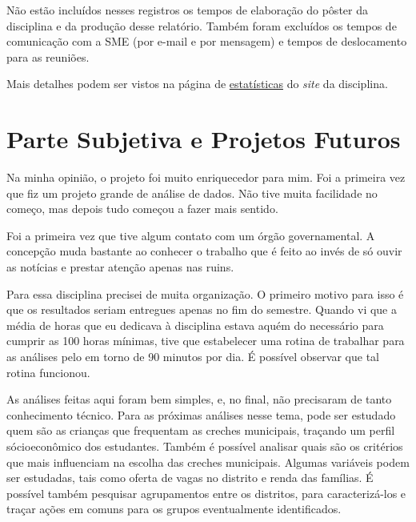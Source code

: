 \documentclass[12pt, a4paper]{article}
\begin{document}
Não estão incluídos nesses registros os tempos de elaboração do pôster da disciplina e da produção desse relatório. Também foram excluídos os tempos de comunicação com a SME (por e-mail e por mensagem) e tempos de deslocamento para as reuniões. 

Mais detalhes podem ser vistos na página de \href{https://lsflp.github.io/MAC0213/estatisticas.html}{estatísticas} do \textit{site} da disciplina.

\section{Parte Subjetiva e Projetos Futuros}

Na minha opinião, o projeto foi muito enriquecedor para mim. Foi a primeira vez que fiz um projeto grande de análise de dados. Não tive muita facilidade no começo, mas depois tudo começou a fazer mais sentido.

Foi a primeira vez que tive algum contato com um órgão governamental. A concepção muda bastante ao conhecer o trabalho que é feito ao invés de só ouvir as notícias e prestar atenção apenas nas ruins.

Para essa disciplina precisei de muita organização. O primeiro motivo para isso é que os resultados seriam entregues apenas no fim do semestre. Quando vi que a média de horas que eu dedicava à disciplina estava aquém do necessário para cumprir as 100 horas mínimas, tive que estabelecer uma rotina de trabalhar para as análises pelo em torno de 90 minutos por dia. É possível observar que tal rotina funcionou. 

As análises feitas aqui foram bem simples, e, no final, não precisaram de tanto conhecimento técnico. Para as próximas análises nesse tema, pode ser estudado quem são as crianças que frequentam as creches municipais, traçando um perfil sócioeconômico dos estudantes. Também é possível analisar quais são os critérios que mais influenciam na escolha das creches municipais. Algumas variáveis podem ser estudadas, tais como oferta de vagas no distrito e renda das famílias. É possível também pesquisar agrupamentos entre os distritos, para caracterizá-los e traçar ações em comuns para os grupos eventualmente identificados. 
\end{document}
